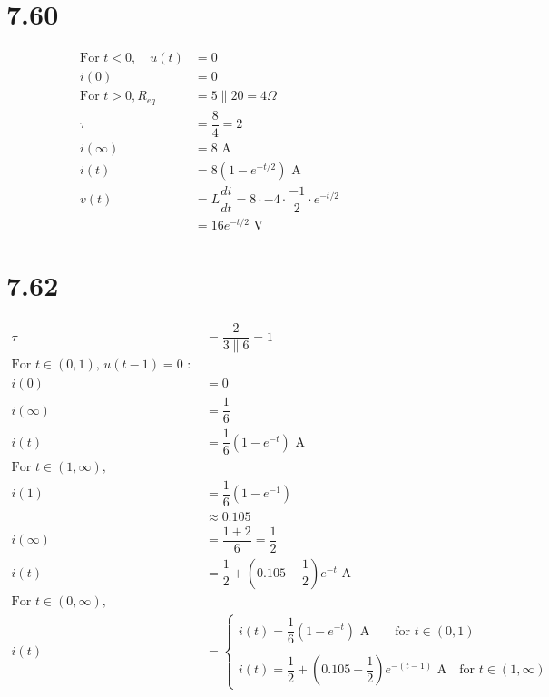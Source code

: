 \documentclass[a4paper,12pt,openany]{article}
\begin{document}
\section*{7.60}
\begin{align*}
    \text{For } t < 0, \quad u(t) &= 0 \\
    i(0) &= 0\\
    \text{For } t > 0, R_{eq} &= 5\parallel 20 = 4 \Omega \\
    \tau &= \dfrac{8}{4} = 2 \\
    i(\infty) &= 8 \text{ A} \\
    i(t) &= 8(1 - e^{-t/2}) \text{ A} \\
    v(t) &= L \dfrac{di}{dt} = 8 \cdot -4 \cdot \dfrac{-1}{2} \cdot e^{-t/2} \qquad \qquad \\
    &= 16e^{-t/2} \text{ V}
\end{align*}

\section*{7.62}
\begin{align*}
    \tau &= \dfrac{2}{3 \parallel 6} = 1 \\
    \text{For $t \in (0, 1)$, $u(t-1) = 0$ : }& \\
    i(0) &= 0 \\
    i(\infty) &= \dfrac{1}{6} \\
    i(t) &= \dfrac{1}{6}(1 - e^{-t}) \text{ A} \\
    \text{For $t \in (1, \infty)$,} \\
    i(1) &= \dfrac{1}{6}(1 - e^{-1}) \\
    &\approx 0.105 \\
    i(\infty) &= \dfrac{1 + 2}{6} = \dfrac{1}{2}\\
    i(t) &= \dfrac{1}{2} + (0.105 - \dfrac{1}{2})e^{-t} \text{ A} \\
    \text{For $t \in (0, \infty)$,}& \\
    i(t) &=
    \begin{cases}
        i(t) = \dfrac{1}{6}(1 - e^{-t}) \text{ A} \qquad \text{for } t \in (0, 1) \\
        \\
        i(t) = \dfrac{1}{2} + (0.105 - \dfrac{1}{2})e^{-(t-1)} \text{ A} \quad \text{for } t \in (1, \infty)
    \end{cases}
\end{align*}
\end{document}
